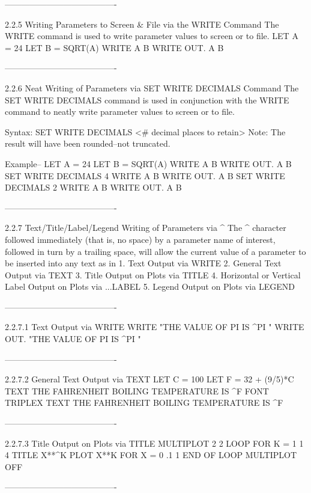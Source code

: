 ----------------------------------------
 
2.2.5
Writing Parameters to Screen & File via the WRITE Command
   The WRITE command is used to write parameter values
   to screen or to file.
      LET A = 24
      LET B = SQRT(A)
      WRITE A B
      WRITE OUT. A B
 
----------------------------------------
 
2.2.6
Neat Writing of Parameters via SET WRITE DECIMALS Command
   The SET WRITE DECIMALS command is used in conjunction
   with the WRITE command to neatly write parameter values
   to screen or to file.
 
   Syntax:  SET WRITE DECIMALS    <# decimal places to retain>
   Note:    The result will have been rounded--not truncated.
 
   Example--
      LET A = 24
      LET B = SQRT(A)
      WRITE A B
      WRITE OUT. A B
      SET WRITE DECIMALS 4
      WRITE A B
      WRITE OUT. A B
      SET WRITE DECIMALS 2
      WRITE A B
      WRITE OUT. A B
 
----------------------------------------
 
2.2.7
Text/Title/Label/Legend Writing of Parameters via ^
   The ^ character
   followed immediately (that is, no space)
   by a parameter name of interest,
   followed in turn by a trailing space,
   will allow the current value of a parameter to be inserted
   into any text as in
      1. Text Output via WRITE
      2. General Text Output via TEXT
      3. Title Output on Plots via TITLE
      4. Horizontal or Vertical Label Output on Plots via ...LABEL
      5. Legend Output on Plots via LEGEND
 
----------------------------------------
 
2.2.7.1
Text Output via WRITE
      WRITE "THE VALUE OF PI IS ^PI "
      WRITE OUT. "THE VALUE OF PI IS ^PI "
 
----------------------------------------
 
2.2.7.2
General Text Output via TEXT
      LET C = 100
      LET F = 32 + (9/5)*C
      TEXT THE FAHRENHEIT BOILING TEMPERATURE IS ^F
      FONT TRIPLEX
      TEXT THE FAHRENHEIT BOILING TEMPERATURE IS ^F
 
----------------------------------------
 
2.2.7.3
Title Output on Plots via TITLE
      MULTIPLOT 2 2
      LOOP FOR K = 1 1 4
      TITLE X**^K
      PLOT X**K FOR X = 0 .1 1
      END OF LOOP
      MULTIPLOT OFF
 
----------------------------------------
 
